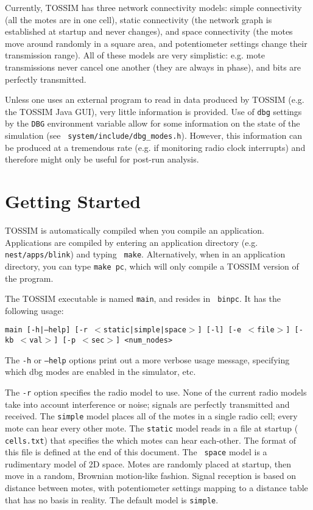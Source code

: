 \documentclass[12pt]{article}
\begin{document}
Currently, TOSSIM has three network connectivity models: simple
connectivity (all the motes are in one cell), static connectivity (the
network graph is established at startup and never changes), and space
connectivity (the motes move around randomly in a square area, and
potentiometer settings change their transmission range). All of these
models are very simplistic: e.g. mote transmissions never cancel one
another (they are always in phase), and bits are perfectly
transmitted.

Unless one uses an external program to read in data produced by TOSSIM
(e.g. the TOSSIM Java GUI), very little information is provided. Use
of {\tt dbg} settings by the {\tt DBG} environment variable allow for
some information on the state of the simulation (see {\tt
system/include/dbg\_modes.h}). However, this information can be
produced at a tremendous rate (e.g. if monitoring radio clock
interrupts) and therefore might only be useful for post-run analysis.

\section*{Getting Started}

TOSSIM is automatically compiled when you compile an
application. Applications are compiled by entering an application
directory (e.g. {\tt nest/apps/blink}) and typing {\tt
make}. Alternatively, when in an application directory, you can type
{\tt make pc}, which will only compile a TOSSIM version of the
program.

The TOSSIM executable is named {\tt main}, and resides in {\tt
binpc}. It has the following usage:


{\tt main [-h|--help] [-r $<$static|simple|space$>$] [-l] [-e $<$file$>$] [-kb $<$val$>$] [-p $<$sec$>$] <num\_nodes>}

The {\tt -h} or {\tt --help} options print out a more verbose usage
message, specifying which dbg modes are enabled in the simulator, etc.

The {\tt -r} option specifies the radio model to use. None of the
current radio models take into account interference or noise; signals
are perfectly transmitted and received. The {\tt simple} model places
all of the motes in a single radio cell; every mote can hear every
other mote. The {\tt static} model reads in a file at startup ({\tt
cells.txt}) that specifies the which motes can hear each-other. The
format of this file is defined at the end of this document. The {\tt
space} model is a rudimentary model of 2D space. Motes are randomly
placed at startup, then move in a random, Brownian motion-like
fashion. Signal reception is based on distance between motes, with
potentiometer settings mapping to a distance table that has no basis
in reality. The default model is {\tt simple}.
\end{document}
